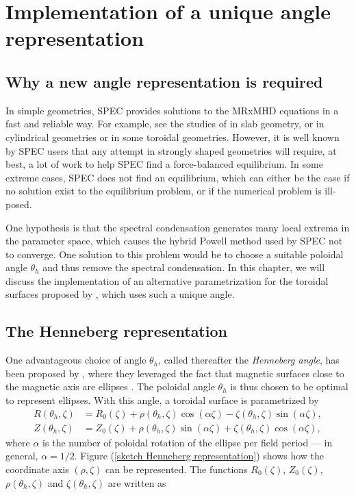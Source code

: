 \documentclass[my_thesis.tex]{subfiles}
\begin{document}
\section{Implementation of a unique angle representation \label{sec. angle representation}}

\subsection{Why a new angle representation is required}
In simple geometries, SPEC provides solutions to the MRxMHD equations in a fast and reliable way. For example, see the studies of \citet{Qu2021,Loizu2020} in slab geometry, or \citet{Kumar2021} in cylindrical geometries or \citet{Kumar2022} in some toroidal geometries. However, it is well known by SPEC users that any attempt in strongly shaped geometries will require, at best, a lot of work to help SPEC find a force-balanced equilibrium. In some extreme cases, SPEC does not find an equilibrium, which can either be the case if no solution exist to the equilibrium problem, or if the numerical problem is ill-posed. 


One hypothesis is that the spectral condensation generates many local extrema in the parameter space, which causes the hybrid Powell method used by SPEC not to converge. One solution to this problem would be to choose a suitable poloidal angle $\theta_h$ and thus remove the spectral condensation. In this chapter, we will discuss the implementation of an alternative parametrization for the toroidal surfaces proposed by \citep{Henneberg2021}, which uses such a unique angle. 

\subsection{The Henneberg representation}
One advantageous choice of angle $\theta_h$, called thereafter the \emph{Henneberg angle}, has been proposed by \citet{Henneberg2021}, where they leveraged the fact that magnetic surfaces close to the magnetic axis are ellipses \citep{Helander2014}. The poloidal angle $\theta_h$ is thus chosen to be optimal to represent ellipses. With this angle, a toroidal surface is parametrized by
\begin{eqnarray}
	R(\theta_h,\zeta) &= R_0(\zeta) + \rho(\theta_h,\zeta)\cos(\alpha \zeta) - \zeta(\theta_h,\zeta)\sin(\alpha \zeta), \label{eq.Rfctrhophi}\\
	Z(\theta_h,\zeta) &= Z_0(\zeta) + \rho(\theta_h,\zeta)\sin(\alpha \zeta) + \zeta(\theta_h,\zeta)\cos(\alpha \zeta),\label{eq.Zfctrhophi}
\end{eqnarray}
where $\alpha$ is the number of poloidal rotation of the ellipse per field period --- in general, $\alpha=1/2$. Figure (\ref{sketch Henneberg representation}) shows how the coordinate axis $(\rho,\zeta)$ can be represented. The functions $R_0(\zeta)$, $Z_0(\zeta)$, $\rho(\theta_h,\zeta)$ and $\zeta(\theta_h,\zeta)$ are written as
\end{document}
